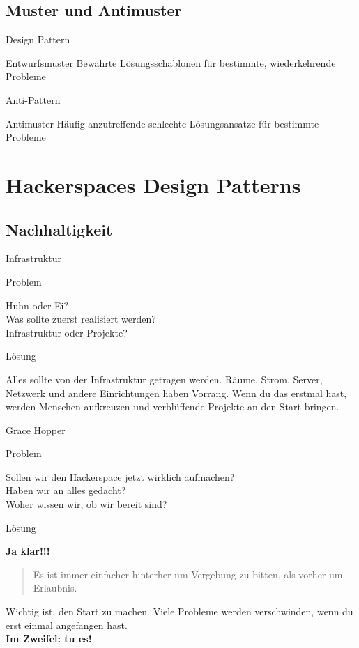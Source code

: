 \documentclass[aspectratio=1610]{beamer}
\newcommand{\concept}[2]{
  \begin{block}{#1}
    \pause
    #2
  \end{block}
}
\newcommand{\pattern}[2]{
  \begin{alertblock}{Problem}
    #1
  \end{alertblock}
  \pause
  \begin{exampleblock}{Lösung}
    #2
  \end{exampleblock}
}
\begin{document}
  \subsection{Muster und Antimuster}

  \begin{frame}{Design Pattern}
    \concept{Entwurfsmuster}{Bewährte Lösungsschablonen für bestimmte, wiederkehrende Probleme}
  \end{frame}

  \begin{frame}{Anti-Pattern}
    \concept{Antimuster}{Häufig anzutreffende schlechte Lösungsansatze für bestimmte Probleme}
  \end{frame}

  \section{Hackerspaces Design Patterns}

  \subsection{Nachhaltigkeit}

  \begin{frame}{Infrastruktur}
    \pattern{
      Huhn oder Ei?\\
      Was sollte zuerst realisiert werden?\\
      Infrastruktur oder Projekte?
    }{
      Alles sollte von der Infrastruktur getragen werden. Räume, Strom, Server,
      Netzwerk und andere Einrichtungen haben Vorrang. Wenn du das erstmal hast,
      werden Menschen aufkreuzen und verblüffende Projekte an den Start
      bringen.
    }
  \end{frame}

  \begin{frame}{Grace Hopper}
    \pattern{
      Sollen wir den Hackerspace jetzt wirklich aufmachen?\\
      Haben wir an alles gedacht?\\
      Woher wissen wir, ob wir bereit sind?
    }{
      \textbf{Ja klar!!!}
      \pause
      \begin{quote}
        Es ist immer einfacher hinterher um Vergebung zu bitten, als vorher um
        Erlaubnis.
      \end{quote}
      \pause
      Wichtig ist, den Start zu machen. Viele Probleme werden verschwinden, wenn
      du erst einmal angefangen hast.\\
      \textbf{Im Zweifel: tu es!}
    }
  \end{frame}
\end{document}
